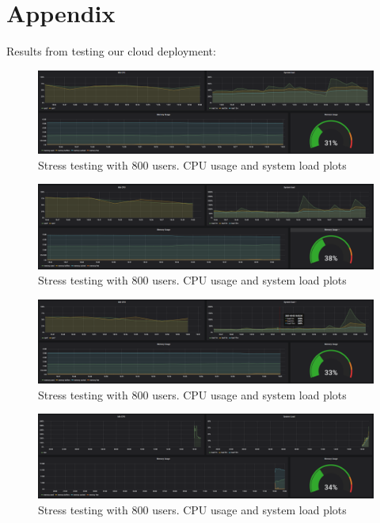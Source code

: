\documentclass[oneside]{article}
\newcommand*\fpar{\hspace{1ex}}
\begin{document}
\section{Appendix}
\label{appendix}
\fpar Results from testing our cloud deployment:
\begin{figure}[H]
  \centering
  \includegraphics[width=\textwidth]{ tests/img1.png }
  \caption{Stress testing with 800 users. CPU usage and system load plots}
\end{figure}
\begin{figure}[H]
  \centering
  \includegraphics[width=\textwidth]{ tests/img2.png }
  \caption{Stress testing with 800 users. CPU usage and system load plots}
\end{figure}
\begin{figure}[H]
  \centering
  \includegraphics[width=\textwidth]{ tests/img3.png }
  \caption{Stress testing with 800 users. CPU usage and system load plots}
\end{figure}
\begin{figure}[H]
  \centering
  \includegraphics[width=\textwidth]{ tests/img4.png }
  \caption{Stress testing with 800 users. CPU usage and system load plots}
\end{figure}
\end{document}
